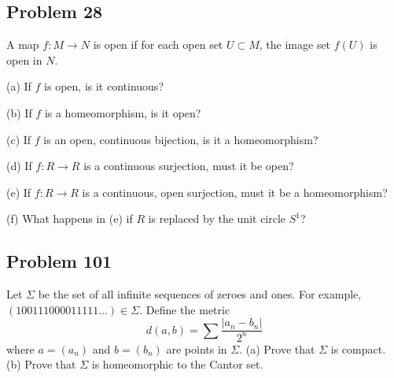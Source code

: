 \documentclass{amsart}
\begin{document}
\noindent

\bigskip

\subsection*{Problem 28} A map $f : M \rightarrow N$ is open if for each open set $U \subset M$, the image set $f(U)$ is
open in $N$.

(a) If $f$ is open, is it continuous?

(b) If $f$ is a homeomorphism, is it open?

(c) If $f$ is an open, continuous bijection, is it a homeomorphism?

(d) If $f : R \rightarrow R$ is a continuous surjection, must it be open?

(e) If $f : R \rightarrow R$ is a continuous, open surjection, must it be a homeomorphism?

(f) What happens in (e) if $R$ is replaced by the unit circle $S^1$?

\noindent

\bigskip

\subsection*{Problem 101} Let $\Sigma$ be the set of all infinite sequences of zeroes and ones. For example, $(100111000011111 . . .) \in\Sigma$. Define the metric
$$d(a,b)=\sum \frac{|a_n-b_n|}{2^n}$$
where $a = (a_n)$ and $b = (b_n)$ are points in $\Sigma$.
(a) Prove that $\Sigma$ is compact.
(b) Prove that $\Sigma$ is homeomorphic to the Cantor set.

\noindent

\bigskip
\end{document}
